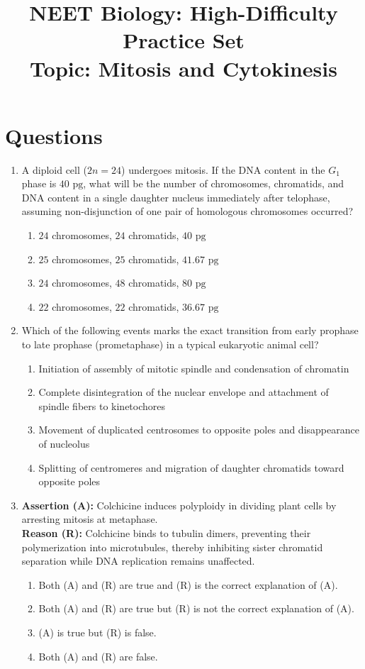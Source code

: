 \documentclass[11pt,a4paper]{article}
\title{\textbf{NEET Biology: High-Difficulty Practice Set}\\ \large Topic: Mitosis and Cytokinesis}
\author{}
\date{}
\begin{document}
\maketitle

\section*{Questions}

\begin{enumerate}[label=\textbf{\arabic*.}, leftmargin=*]

\item A diploid cell ($2n = 24$) undergoes mitosis. If the DNA content in the $G_1$ phase is $40\text{ pg}$, what will be the number of chromosomes, chromatids, and DNA content in a single daughter nucleus immediately after telophase, assuming non-disjunction of one pair of homologous chromosomes occurred?
\begin{enumerate}[label=(\alph*)]
    \item $24$ chromosomes, $24$ chromatids, $40\text{ pg}$
    \item $25$ chromosomes, $25$ chromatids, $41.67\text{ pg}$
    \item $24$ chromosomes, $48$ chromatids, $80\text{ pg}$
    \item $22$ chromosomes, $22$ chromatids, $36.67\text{ pg}$
\end{enumerate}

\item Which of the following events marks the exact transition from early prophase to late prophase (prometaphase) in a typical eukaryotic animal cell?
\begin{enumerate}[label=(\alph*)]
    \item Initiation of assembly of mitotic spindle and condensation of chromatin
    \item Complete disintegration of the nuclear envelope and attachment of spindle fibers to kinetochores
    \item Movement of duplicated centrosomes to opposite poles and disappearance of nucleolus
    \item Splitting of centromeres and migration of daughter chromatids toward opposite poles
\end{enumerate}

\item \textbf{Assertion (A):} Colchicine induces polyploidy in dividing plant cells by arresting mitosis at metaphase.\\
\textbf{Reason (R):} Colchicine binds to tubulin dimers, preventing their polymerization into microtubules, thereby inhibiting sister chromatid separation while DNA replication remains unaffected.
\begin{enumerate}[label=(\alph*)]
    \item Both (A) and (R) are true and (R) is the correct explanation of (A).
    \item Both (A) and (R) are true but (R) is not the correct explanation of (A).
    \item (A) is true but (R) is false.
    \item Both (A) and (R) are false.
\end{enumerate}


\end{enumerate}
\end{document}
